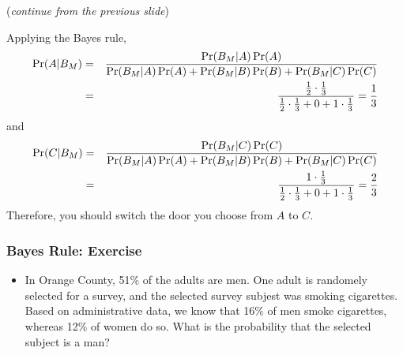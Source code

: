 \documentclass[pdflatex, 12pt]{beamer}
\begin{document}
\begin{frame}
(\emph{continue from the previous slide})

\vspace{0.4cm}
Applying the Bayes rule,
{\footnotesize
\begin{eqnarray}
\Pr(A|B_{M}) &=& \frac{\Pr(B_M|A)\Pr(A)}{\Pr(B_M|A)\Pr(A) + \Pr(B_M|B)\Pr(B) + \Pr(B_M|C)\Pr(C)} \notag \\
&=& \frac{\frac{1}{2} \cdot \frac{1}{3}}{\frac{1}{2} \cdot \frac{1}{3} + 0 + 1 \cdot \frac{1}{3}} = \frac{1}{3} \notag
\end{eqnarray}
}
and 
{\footnotesize
\begin{eqnarray}
\Pr(C|B_{M}) &=& \frac{\Pr(B_M|C)\Pr(C)}{\Pr(B_M|A)\Pr(A) + \Pr(B_M|B)\Pr(B) + \Pr(B_M|C)\Pr(C)} \notag \\
&=& \frac{1 \cdot \frac{1}{3}}{\frac{1}{2} \cdot \frac{1}{3} + 0 + 1 \cdot \frac{1}{3}} = \frac{2}{3} \notag
\end{eqnarray}
}
Therefore, you should switch the door you choose from $A$ to $C$.
\end{frame}

\begin{frame}
\frametitle{Bayes Rule: Exercise}
\begin{itemize}
\item In Orange County, 51\% of the adults are men. One adult is randomely selected for a survey, and the selected survey subjest was smoking cigarettes. Based on administrative data, we know that 16\% of men smoke cigarettes, whereas 12\% of women do so. What is the probability that the selected subject is a man?
\end{itemize}
\end{frame}
\end{document}
